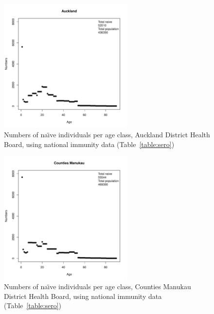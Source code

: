 \documentclass{article}
\begin{document}
\begin{figure}[H]
     \begin{center}
     \includegraphics[width=0.6\textwidth]{dhb3.pdf}
     \end{center}
     \caption{Numbers of na\"{\i}ve individuals per age class, Auckland District Health Board, using national immunity data (Table~\autoref{table:sero})}
     \label{fig:Auckland}
\end{figure}

\begin{figure}[H]
     \begin{center}
     \includegraphics[width=0.6\textwidth]{dhb4.pdf}
     \end{center}
     \caption{Numbers of na\"{\i}ve individuals per age class, Counties Manukau District Health Board, using national immunity data (Table~\autoref{table:sero})}
     \label{fig:Counties_Manukau}
\end{figure}
\end{document}
